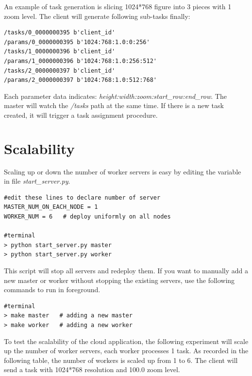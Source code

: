 \documentclass[runningheads,a4paper]{llncs}
\begin{document}
An example of task generation is slicing 1024*768 figure into 3 pieces with 1 zoom level. The client will generate following sub-tasks finally:
\begin{verbatim}
/tasks/0_0000000395 b'client_id'
/params/0_0000000395 b'1024:768:1.0:0:256'
/tasks/1_0000000396 b'client_id'
/params/1_0000000396 b'1024:768:1.0:256:512'
/tasks/2_0000000397 b'client_id'
/params/2_0000000397 b'1024:768:1.0:512:768'
\end{verbatim}

Each parameter data indicates: \emph{height:width:zoom:start\_row:end\_row}. The master will watch the \emph{/tasks} path at the same time. If there is a new task created, it will trigger a task assignment procedure.

\section{Scalability}
Scaling up or down the number of worker servers is easy by editing the variable in file \emph{start\_server.py}. 

\begin{verbatim}
#edit these lines to declare number of server
MASTER_NUM_ON_EACH_NODE = 1  
WORKER_NUM = 6   # deploy uniformly on all nodes

#terminal
> python start_server.py master
> python start_server.py worker
\end{verbatim}
This script will stop all servers and redeploy them. If you want to manually add a new master or worker without stopping the existing servers, use the following commands to run in foreground.

\begin{verbatim}
#terminal
> make master   # adding a new master
> make worker   # adding a new worker
\end{verbatim}

To test the scalability of the cloud application, the following experiment will scale up the number of worker servers, each worker processes 1 task. As recorded in the following table, the number of workers is scaled up from 1 to 6. The client will send a task with 1024*768 resolution and 100.0 zoom level.
\end{document}

